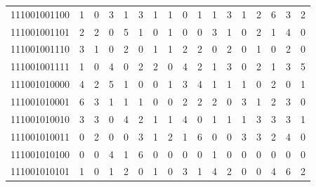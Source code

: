 \documentclass[10pt,a4paper]{article}
\begin{document}
\begin{longtable}{ |c|c|c|c|c|c|c|c|c|c|c|c|c|c|c|c|c| }
    111001001100              & 1                            & 0                                & 3                            & 1                              & 3   & 1   & 1   & 0   & 1   & 1   & 3   & 1   & 2   & 6   & 3   & 2   \\
    111001001101              & 2                            & 2                                & 0                            & 5                              & 1   & 0   & 1   & 0   & 0   & 3   & 1   & 0   & 2   & 1   & 4   & 0   \\
    111001001110              & 3                            & 1                                & 0                            & 2                              & 0   & 1   & 1   & 2   & 2   & 0   & 2   & 0   & 1   & 0   & 2   & 0   \\
    111001001111              & 1                            & 0                                & 4                            & 0                              & 2   & 2   & 0   & 4   & 2   & 1   & 3   & 0   & 2   & 1   & 3   & 5   \\
    111001010000              & 4                            & 2                                & 5                            & 1                              & 0   & 0   & 1   & 3   & 4   & 1   & 1   & 1   & 0   & 2   & 0   & 1   \\
    111001010001              & 6                            & 3                                & 1                            & 1                              & 1   & 0   & 0   & 2   & 2   & 2   & 0   & 3   & 1   & 2   & 3   & 0   \\
    111001010010              & 3                            & 3                                & 0                            & 4                              & 2   & 1   & 1   & 4   & 0   & 1   & 1   & 1   & 3   & 3   & 3   & 1   \\
    111001010011              & 0                            & 2                                & 0                            & 0                              & 3   & 1   & 2   & 1   & 6   & 0   & 0   & 3   & 3   & 2   & 4   & 0   \\
    111001010100              & 0                            & 0                                & 4                            & 1                              & 6   & 0   & 0   & 0   & 0   & 1   & 0   & 0   & 0   & 0   & 0   & 0   \\
    111001010101              & 1                            & 0                                & 1                            & 2                              & 0   & 1   & 0   & 3   & 1   & 4   & 2   & 0   & 0   & 4   & 6   & 2   \\

\end{longtable}
\end{document}
